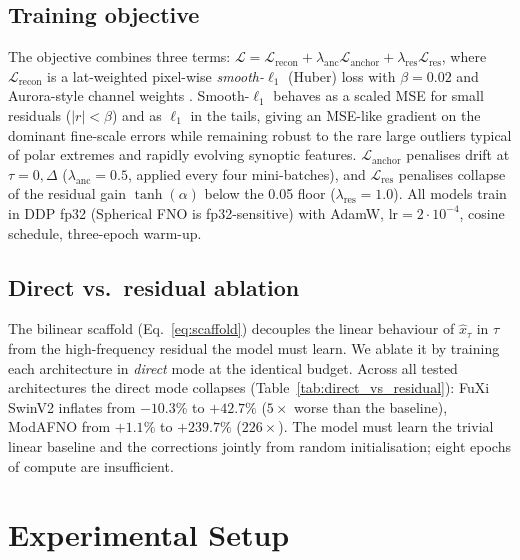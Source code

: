 \documentclass[10pt,letterpaper,twocolumn]{article}
\begin{document}
\subsection{Training objective}

The objective combines three terms:
$\mathcal{L} = \mathcal{L}_{\text{recon}}
+ \lambda_{\text{anc}} \mathcal{L}_{\text{anchor}}
+ \lambda_{\text{res}} \mathcal{L}_{\text{res}}$,
where $\mathcal{L}_{\text{recon}}$ is a lat-weighted pixel-wise
\emph{smooth-$\ell_1$} (Huber) loss with $\beta{=}0.02$ and Aurora-style
channel weights \cite{bodnar2024aurora}. Smooth-$\ell_1$ behaves as a
scaled MSE for small residuals ($|r|<\beta$) and as $\ell_1$ in the
tails, giving an MSE-like gradient on the dominant fine-scale errors
while remaining robust to the rare large outliers typical of polar
extremes and rapidly evolving synoptic features.
$\mathcal{L}_{\text{anchor}}$ penalises drift at $\tau{=}0, \Delta$
($\lambda_{\text{anc}}{=}0.5$, applied every four mini-batches), and
$\mathcal{L}_{\text{res}}$ penalises collapse of the residual gain
$\tanh(\alpha)$ below the 0.05 floor ($\lambda_{\text{res}}{=}1.0$).
All models train in DDP fp32 (Spherical FNO is fp32-sensitive) with
AdamW, $\text{lr}{=}2{\cdot}10^{-4}$, cosine schedule, three-epoch
warm-up.

\subsection{Direct vs.\ residual ablation}
\label{sec:ablation}

The bilinear scaffold (Eq.~\ref{eq:scaffold}) decouples the linear
behaviour of $\hat x_\tau$ in $\tau$ from the high-frequency residual
the model must learn. We ablate it by training each architecture in
\emph{direct} mode at the identical budget. Across all tested
architectures the direct mode collapses (Table~\ref{tab:direct_vs_residual}):
FuXi SwinV2 inflates from $-10.3\%$ to $+42.7\%$ ($5{\times}$ worse than
the baseline), ModAFNO from $+1.1\%$ to $+239.7\%$ ($226{\times}$). The
model must learn the trivial linear baseline and the corrections jointly
from random initialisation; eight epochs of compute are insufficient.



\section{Experimental Setup}
\label{sec:setup}
\end{document}

